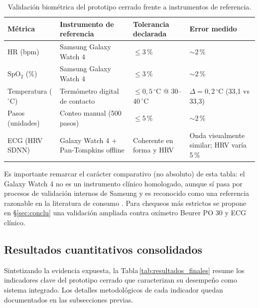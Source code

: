 \documentclass[letterpaper,11pt]{article}
\newcommand{\rtabla}[1]{Tabla\,\ref{#1}}
\begin{document}
\begin{table}[H]
    \centering
    \caption{Validaci\'on biom\'etrica del prototipo cerrado frente a instrumentos de referencia.}
    \label{tab:validacion}
    \footnotesize
    \begin{tabular}{|L{2.5cm}|L{4.0cm}|L{3.0cm}|L{4.2cm}|}\hline
    \textbf{M\'etrica} & \textbf{Instrumento de referencia} & \textbf{Tolerancia declarada} & \textbf{Error medido} \\\hline
    HR (bpm) & Samsung Galaxy Watch 4 \cite{galaxy_watch4} & $\leq 3$\,\% & $\sim 2$\,\% \\\hline
    SpO$_2$ (\%) & Samsung Galaxy Watch 4 \cite{galaxy_watch4} & $\leq 3$\,\% & $\sim 2$\,\% \\\hline
    Temperatura ($^\circ$C) & Term\'ometro digital de contacto & $\leq 0{,}5\,^\circ$C @ 30--40\,$^\circ$C & $\Delta = 0{,}2\,^\circ$C (33{,}1 vs 33{,}3) \\\hline
    Pasos (unidades) & Conteo manual (500 pasos) & $\leq 5$\,\% & $\sim 2$\,\% \\\hline
    ECG (HRV SDNN) & Galaxy Watch 4 \cite{galaxy_watch4} + Pan-Tompkins offline & Coherente en forma y HRV & Onda visualmente similar; HRV varía 5\,\% \\\hline
    \end{tabular}
\end{table}

Es importante remarcar el car\'acter comparativo (no absoluto) de esta tabla: el Galaxy Watch 4 no es un instrumento cl\'inico homologado, aunque s\'i pasa por procesos de validaci\'on internos de Samsung y es reconocido como una referencia razonable en la literatura de consumo \cite{Shin2019}. Para chequeos m\'as estrictos se propone en \S\ref{sec:conclu} una validaci\'on ampliada contra ox\'imetro Beurer PO 30 \cite{beurer_po30} y ECG cl\'inico.

\subsection{Resultados cuantitativos consolidados}

Sintetizando la evidencia expuesta, la \rtabla{tab:resultados_finales} resume los indicadores clave del prototipo cerrado que caracterizan su desempe\~no como sistema integrado. Los detalles metodol\'ogicos de cada indicador quedan documentados en las subsecciones previas.
\end{document}
